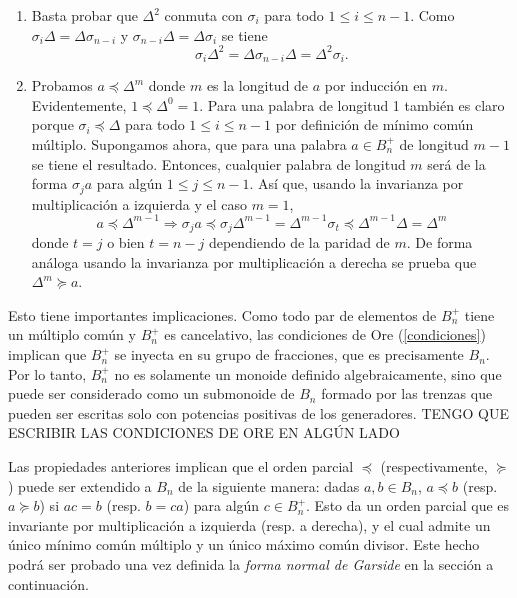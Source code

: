 \documentclass[bibtex, anon]{TEMat-article}
\begin{document}
\begin{demostracion}
\begin{enumerate}
		
		\item Basta probar que $\Delta^2$ conmuta con $\sigma_i$ para todo $1\leq i\leq n-1$. Como $\sigma_i\Delta=\Delta\sigma_{n-i}$ y $\sigma_{n-i}\Delta=\Delta\sigma_i$ se tiene
		\[
		\sigma_i\Delta^2=\Delta\sigma_{n-i}\Delta=\Delta^2\sigma_i.
		\]
		
		
		\item Probamos $a\preccurlyeq\Delta^m$ donde $m$ es la longitud de $a$ por inducción en $m$. Evidentemente, $1\preccurlyeq\Delta^0=1$. Para una palabra de longitud 1 también es claro porque $\sigma_i\preccurlyeq\Delta$ para todo $1\leq i\leq n-1$ por definición de mínimo común múltiplo. Supongamos ahora, que para una palabra $a\in B_n^+$ de longitud $m-1$ se tiene el resultado. Entonces, cualquier palabra de longitud $m$ será de la forma $\sigma_j a$ para algún $1\leq j\leq n-1$. Así que, usando la invarianza por multiplicación a izquierda y el caso $m=1$,
		\[
		a\preccurlyeq\Delta^{m-1}\Rightarrow \sigma_j a\preccurlyeq \sigma_j\Delta^{m-1} =\Delta^{m-1}\sigma_t\preccurlyeq \Delta^{m-1}\Delta=\Delta^{m}
		\]
		donde $t=j$ o bien $t=n-j$ dependiendo de la paridad de $m$. De forma análoga usando la invarianza por multiplicación a derecha se prueba que $\Delta^m\succcurlyeq a$.
	\end{enumerate}
	
\end{demostracion}



Esto tiene importantes implicaciones. Como todo par de elementos de $B_n^+$ tiene un múltiplo común y $B_n^+$ es cancelativo, las condiciones de Ore (\ref{condiciones}) implican que $B_n^+$ se inyecta en su grupo de fracciones, que es precisamente $B_n$. Por lo tanto, $B_n^+$ no es solamente un monoide definido algebraicamente, sino que puede ser considerado como un submonoide de $B_n$ formado por las trenzas que pueden ser escritas solo con potencias positivas de los generadores. TENGO QUE ESCRIBIR LAS CONDICIONES DE ORE EN ALGÚN LADO

Las propiedades anteriores implican que el orden parcial $\preccurlyeq$ (respectivamente, $\succcurlyeq$) puede ser extendido a $B_n$ de la siguiente manera: dadas $a,b\in B_n$, $a\preccurlyeq b$ (resp. $a\succcurlyeq b$) si $ac=b$ (resp. $b=ca$) para algún $c\in B_n^+$. Esto da un orden parcial que es invariante por multiplicación a izquierda (resp. a derecha), y el cual admite un único mínimo común múltiplo y un único máximo común divisor. Este hecho podrá ser probado una vez definida la \emph{forma normal de Garside} en la sección a continuación.
\end{document}
